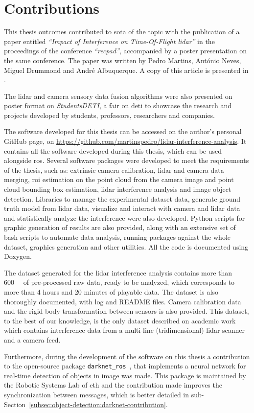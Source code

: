 \section{Contributions} 
\label{section:introduction:contributions}
This thesis outcomes contributed to \acl{sota} of the topic with the publication of a paper entitled \textit{``Impact of Interference on Time-Of-Flight \acs{lidar}''} in the proceedings of the conference \textit{``\acl{recpad}''}, accompanied by a poster presentation on the same conference. The paper was written by Pedro Martins, António Neves, Miguel Drummond and André Albuquerque. A copy of this article is presented in .

The \ac{lidar} and camera sensory data fusion algorithms were also presented on poster format on \textit{Students\@ DETI}, a fair on \acl{deti} to showcase the research and projects developed by students, professors, researchers and companies.

The software developed for this thesis can be accessed on the author's personal GitHub page, on \url{https://github.com/martinspedro/lidar-interference-analysis}. It contains all the software developed during this thesis, which can be used alongside \acf{ros}. Several software packages were developed to meet the requirements of the thesis, such as: extrinsic camera calibration, \ac{lidar} and camera data merging, \ac{roi} estimation on the point cloud from the camera image and point cloud bounding box estimation, \ac{lidar} interference analysis and image object detection. Libraries to manage the experimental dataset data, generate ground truth model from \ac{lidar} data, visualize and interact with camera and \ac{lidar} data and statistically analyze the interference were also developed. Python scripts for graphic generation of results are also provided, along with an extensive set of bash scripts to automate data analysis, running packages against the whole dataset, graphics generation and other utilities. All the code is documented using Doxygen.

The dataset generated for the \ac{lidar} interference analysis contains more than \SI{600}{\giga\byte} of pre-processed raw data, ready to be analyzed, which corresponds to more than 4 hours and 20 minutes of playable data. The dataset is also thoroughly documented, with log and README files. Camera calibration data and the rigid body transformation between sensors is also provided. This dataset, to the best of our knowledge, is the only dataset described on academic work which contains interference data from a multi-line (tridimensional) \ac{lidar} scanner and a camera feed.

Furthermore, during the development of the software on this thesis a contribution to the open-source package \texttt{darknet\_ros}~\cite{MarkoBjelonic}, that implements a neural network for real-time detection of objects in image was made. This package is maintained by the Robotic Systems Lab of \acl{eth} and the contribution made improves the synchronization between messages, which is better detailed in sub-Section~\ref{subsec:object-detection:darknet-contribution}.

